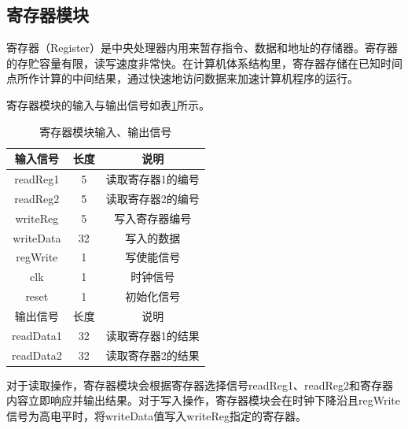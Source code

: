 \documentclass[UTF8]{ctexart}
\begin{document}
\subsection{寄存器模块}
    寄存器（Register）是中央处理器内用来暂存指令、数据和地址的存储器。寄存器的存贮容量有限，读写速度非常快。在计算机体系结构里，寄存器存储在已知时间点所作计算的中间结果，通过快速地访问数据来加速计算机程序的运行。\par
    寄存器模块的输入与输出信号如表\ref{tab:reg-input-output-sig}所示。
    \begin{table}[htbp]
        \centering
        \begin{tabular}{|c|c|c|}
        \hline
        输入信号 & 长度 & 说明 \\
        \hline
        readReg1 & 5 & 读取寄存器1的编号 \\
        readReg2 & 5 & 读取寄存器2的编号 \\
        writeReg & 5 & 写入寄存器编号 \\
        writeData & 32 & 写入的数据 \\
        regWrite & 1 & 写使能信号 \\
        clk & 1 & 时钟信号\\
        reset & 1 & 初始化信号\\
        \hline
        \hline
        输出信号 & 长度 & 说明 \\ \hline
        readData1 & 32 & 读取寄存器1的结果 \\
        readData2 & 32 & 读取寄存器2的结果 \\ \hline
        \end{tabular}
        \caption{寄存器模块输入、输出信号}
        \label{tab:reg-input-output-sig}
    \end{table}\par
    对于读取操作，寄存器模块会根据寄存器选择信号readReg1、readReg2和寄存器内容立即响应并输出结果。对于写入操作，寄存器模块会在时钟下降沿且regWrite信号为高电平时，将writeData值写入writeReg指定的寄存器。
\end{document}
